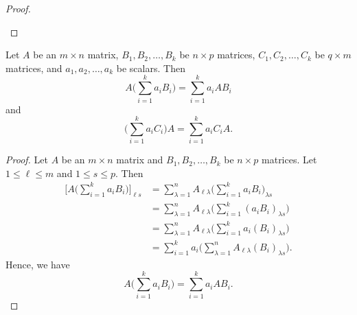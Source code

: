 \begin{proof}
\begin{enumerate}
\end{enumerate}
\end{proof}

\begin{corollary}
    Let \( A  \) be an \( m \times n  \) matrix, \( {B}_{1}, {B}_{2}, \dots, {B}_{k } \) be \( n \times  p  \) matrices, \( {C}_{1}, {C}_{2}, \dots ,{C}_{k }  \) be \( q \times  m  \) matrices, and \( {a}_{1}, {a}_{2}, \dots, {a}_{k }  \) be scalars. Then 
    \[  A \Big( \sum_{ i=1 }^{ k  } {a}_{i} {B}_{i}  \Big) = \sum_{ i=1  }^{  k  } {a}_{i} {AB}_{i} \]
    and
    \[ \Big( \sum_{ i=1 }^{ k  } {a}_{i} {C}_{i}  \Big) A = \sum_{ i=1 }^{ k  } {a}_{i} {C}_{i} A. \]
\end{corollary}

\begin{proof}
Let \( A  \) be an \( m \times n  \) matrix and \( {B}_{1}, {B}_{2}, \dots, {B}_{k } \) be \( n \times p  \) matrices. Let \( 1 \leq \ell \leq m  \) and \( 1 \leq s  \leq p  \). Then
\begin{align*}
    \Big[ A \Big( \sum_{ i=1 }^{ k  } {a}_{i} {B}_{i} \Big) \Big]_{\ell s } &= \sum_{ \lambda = 1  }^{ n } {A}_{ \ell \lambda }  \Big( \sum_{ i=1 }^{ k  } {a}_{i} {B}_{i} \Big)_{\lambda s }  \\
                                                                        &= \sum_{ \lambda = 1  }^{ n  } {A}_{ \ell \lambda } \Big(  \sum_{ i=1  }^{  k  } {({a}_{i} {B}_{i})}_{\lambda s } \Big)  \\
                                                                        &=  \sum_{ \lambda = 1  }^{ n  } {A}_{ \ell \lambda } \Big( \sum_{ i=1 }^{ k  } {a}_{i} ({B}_{i})_{\lambda s } \Big) \\
                                                                        &= \sum_{ i=1  }^{ k  } {a}_{i} \Big( \sum_{ \lambda =1  }^{ n  } {A}_{ \ell \lambda } ({B}_{i})_{\lambda s } \Big) \tag{part (a) of Theorem 2.12}  .  
\end{align*}
Hence, we have
\[  A \Big( \sum_{ i=1 }^{ k  } {a}_{i} {B}_{i}  \Big) = \sum_{ i=1  }^{  k  } {a}_{i} {AB}_{i}.\]


\end{proof}
